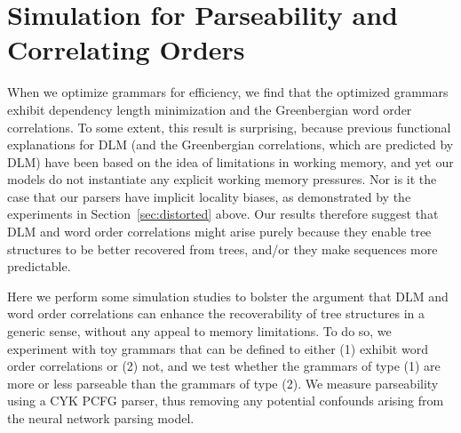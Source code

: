 \documentclass[10pt,twoside,lineno]{article}
\begin{document}







\section{Simulation for Parseability and Correlating Orders}

%

When we optimize grammars for efficiency, we find that the optimized grammars exhibit dependency length minimization and the Greenbergian word order correlations. To some extent, this result is surprising, because previous functional explanations for DLM (and the Greenbergian correlations, which are predicted by DLM) have been based on the idea of limitations in working memory, and yet our models do not instantiate any explicit working memory pressures. Nor is it the case that our parsers have implicit locality biases, as demonstrated by the experiments in Section~\ref{sec:distorted} above. Our results therefore suggest that DLM and word order correlations might arise purely because they enable tree structures to be better recovered from trees, and/or they make sequences more predictable. 

Here we perform some simulation studies to bolster the argument that DLM and word order correlations can enhance the recoverability of tree structures in a generic sense, without any appeal to memory limitations. To do so, we experiment with toy grammars that can be defined to either (1) exhibit word order correlations or (2) not, and we test whether the grammars of type (1) are more or less parseable than the grammars of type (2). We measure parseability using a CYK PCFG parser, thus removing any potential confounds arising from the neural network parsing model.
\end{document}
